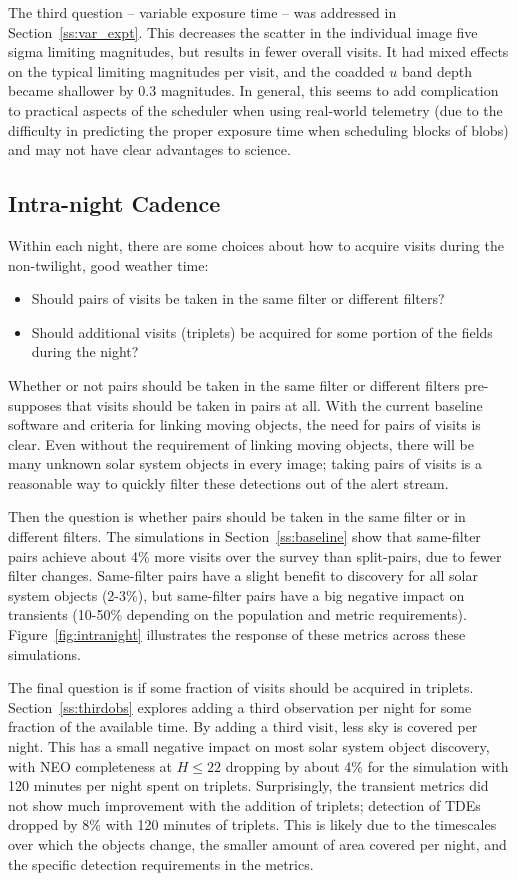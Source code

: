 The third question -- variable exposure time -- was addressed in Section~\ref{ss:var_expt}. This decreases the scatter in the individual image five sigma limiting magnitudes, but results in fewer overall visits. It had mixed effects on the typical limiting magnitudes per visit, and the coadded $u$ band depth became shallower by 0.3 magnitudes. In general, this seems to add complication to practical aspects of the scheduler when using real-world telemetry (due to the difficulty in predicting the proper exposure time when scheduling blocks of blobs) and may not have clear advantages to science. 

\subsection{Intra-night Cadence}\label{sec:intranight}

Within each night, there are some choices about how to acquire visits during the non-twilight, good weather time:
\begin{itemize}
\item Should pairs of visits be taken in the same filter or different filters?
\item Should additional visits (triplets) be acquired for some portion of the fields during the night?
\end{itemize}

Whether or not pairs should be taken in the same filter or different filters pre-supposes that visits should be taken in pairs at all. With the current baseline software and criteria for linking moving objects, the need for pairs of visits is clear. Even without the requirement of linking moving objects, there will be many unknown solar system objects in every image; taking pairs of visits is a reasonable way to quickly filter these detections out of the alert stream. 

Then the question is whether pairs should be taken in the same filter or in different filters. The simulations in Section~\ref{ss:baseline} show that same-filter pairs achieve about 4\% more visits over the survey than split-pairs, due to fewer filter changes. Same-filter pairs have a slight benefit to discovery for all solar system objects (2-3\%), but same-filter pairs have a big negative impact on transients (10-50\% depending on the population and metric requirements). Figure~\ref{fig:intranight} illustrates the response of these metrics across these simulations.

The final question is if some fraction of visits should be acquired in triplets. Section~\ref{ss:thirdobs} explores adding a third observation per night for some fraction of the available time. By adding a third visit, less sky is covered per night. This has a small negative impact on most solar system object discovery, with NEO completeness at $H\le22$ dropping by about 4\% for the simulation with 120 minutes per night spent on triplets. Surprisingly, the transient metrics did not show much improvement with the addition of triplets; detection of TDEs dropped by 8\% with 120 minutes of triplets. This is likely due to the timescales over which the objects change, the smaller amount of area covered per night, and the specific detection requirements in the metrics.  

